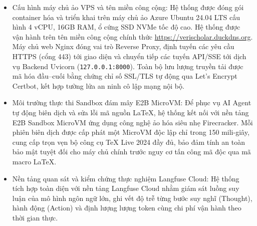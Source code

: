 \begin{itemize}
    \item Cấu hình máy chủ ảo VPS và tên miền công cộng: Hệ thống được đóng gói container hóa và triển khai trên máy chủ ảo Azure Ubuntu 24.04 LTS cấu hình 4 vCPU, 16GB RAM, ổ cứng SSD NVMe tốc độ cao. Hệ thống được vận hành trên tên miền công cộng chính thức \url{https://}\allowbreak\url{verischolar.duckdns.org}. Máy chủ web Nginx đóng vai trò Reverse Proxy, định tuyến các yêu cầu HTTPS (cổng 443) tới giao diện và chuyển tiếp các tuyến API/SSE tới dịch vụ Backend Uvicorn (\texttt{127.0.0.1:8000}). Toàn bộ lưu lượng truyền tải được mã hóa đầu--cuối bằng chứng chỉ số SSL/TLS tự động qua Let's Encrypt Certbot, kết hợp tường lửa an ninh cô lập mạng nội bộ.
    \item Môi trường thực thi Sandbox đám mây E2B MicroVM: Để phục vụ AI Agent tự động biên dịch và sửa lỗi mã nguồn LaTeX, hệ thống kết nối với nền tảng E2B Sandbox MicroVM ứng dụng công nghệ ảo hóa siêu nhẹ Firecracker. Mỗi phiên biên dịch được cấp phát một MicroVM độc lập chỉ trong 150 mili-giây, cung cấp trọn vẹn bộ công cụ TeX Live 2024 đầy đủ, bảo đảm tính an toàn bảo mật tuyệt đối cho máy chủ chính trước nguy cơ tấn công mã độc qua mã macro LaTeX.
    \item Nền tảng quan sát và kiểm chứng thực nghiệm Langfuse Cloud: Hệ thống tích hợp toàn diện với nền tảng Langfuse Cloud nhằm giám sát luồng suy luận của mô hình ngôn ngữ lớn, ghi vết độ trễ từng bước suy nghĩ (Thought), hành động (Action) và định lượng lượng token cùng chi phí vận hành theo thời gian thực.
\end{itemize}

